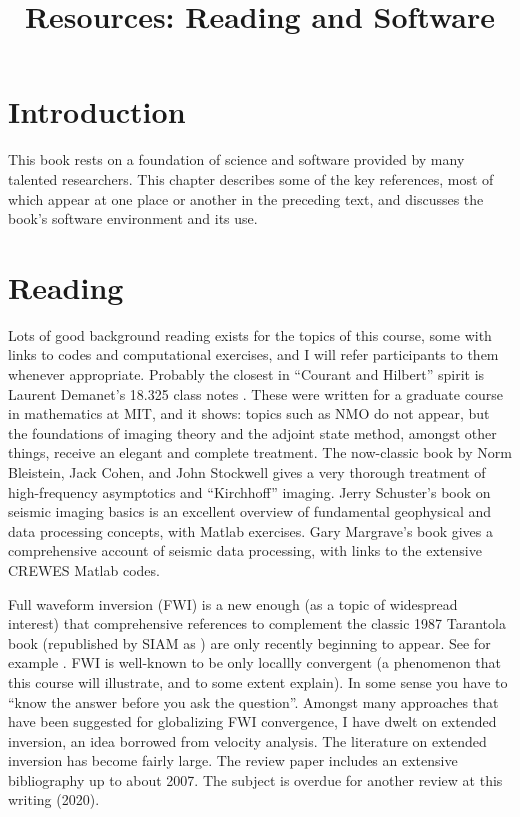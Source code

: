 \title{Resources: Reading and Software}
\maketitle 
\label{ch:madfigs}

\section{Introduction}
This book rests on a foundation of science and software provided by many talented researchers. This chapter describes some of the key references, most of which appear at one place or another in the preceding text, and discusses the book's software environment and its use.


\section{Reading}
Lots of good background reading exists for the topics of this course, some with links to codes and computational exercises, and I will refer participants to them whenever appropriate. Probably the closest in ``Courant and Hilbert'' spirit is Laurent Demanet's 18.325 class notes \cite[]{Demanet:325notes}. These were written for a graduate course in mathematics at MIT, and it shows: topics such as NMO do not appear, but the foundations of imaging theory and the adjoint state method, amongst other things, receive an elegant and complete treatment. The now-classic book by Norm Bleistein, Jack Cohen, and John Stockwell \cite[]{BleisteinCohenStockwell:01} gives a very thorough treatment of high-frequency asymptotics and ``Kirchhoff'' imaging.  Jerry Schuster's book on seismic imaging basics \cite[]{Schuster:10} is an excellent overview of fundamental geophysical and data processing concepts, with Matlab exercises. Gary Margrave's book \cite[]{Margrave:book} gives a comprehensive account of seismic data processing, with links to the extensive CREWES Matlab codes. 

Full waveform inversion (FWI) is a new enough (as a topic of widespread interest) that comprehensive references to complement the classic 1987 Tarantola book (republished by SIAM as \cite[]{Tarantola:05}) are only recently beginning to appear. See for example \cite{Fichtner:10}. FWI is well-known to be only locallly convergent (a phenomenon that this course will illustrate, and to some extent explain). In some sense you have to ``know the answer before you ask the question''.  Amongst many approaches that have been suggested for globalizing FWI convergence, I have dwelt on extended inversion, an idea borrowed from velocity analysis. The literature on extended inversion has become fairly large. The review paper \cite{geoprosp:2008} includes an extensive bibliography up to about 2007. The subject is overdue for another review at this writing (2020).

